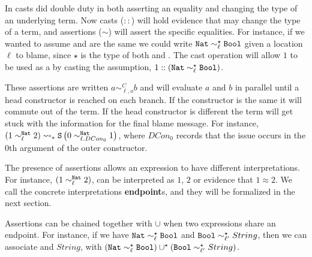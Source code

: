 
In  casts did double duty in both asserting an equality and changing the type of an underlying term.
Now casts ($::$) will hold evidence that may change the type of a term, and assertions ($\sim$) will assert the specific equalities.
For instance, if we wanted to assume \Nat{} and \Bool{} are the same we could write $\mathtt{Nat}{} \sim_{\ell}^{\star}\mathtt{Bool}{} $ given a location $\ell$ to blame, since $\star$ is the type of both \Nat{} and \Bool{}.
The cast operation will allow $1$ to be used as a \Bool{} by casting the assumption, $1::\left(\mathtt{Nat}{} \sim_{\ell}^{\star}\mathtt{Bool}{} \right)$. 

These assertions are written $a\sim_{\ell,o}^{C}b$ and will evaluate $a$ and $b$ in parallel until a head constructor is reached on each branch.
If the constructor is the same it will commute out of the term.
If the head constructor is different the term will get stuck with the information for the final blame message.
For instance, $\left(1 \sim_{\ell}^{\mathtt{Nat}{}} 2 \right)\rightsquigarrow_{*} \mathtt{S}{} \left(0 \sim_{\ell.DCon_{0}}^{\mathtt{Nat}{}} 1\right) $, where $DCon_{0}$ records that the issue occurs in the 0th argument of the outer \Suc constructor.


The presence of assertions allows an expression to have different interpretations.
For instance, $\left(1 \sim_{\ell}^{\mathtt{Nat}{}} 2 \right)$, can be interpreted as $1$, $2$ or evidence that $1\approx2$.
We call the concrete interpretations \textbf{endpoint}s, and they will be formalized in the next section.

Assertions can be chained together with $\cup$ when two expressions share an endpoint. %
For instance, if we have $\mathtt{Nat}{} \sim_{\ell}^{\star}\mathtt{Bool}{}$ and $\mathtt{Bool}{} \sim_{\ell'}^{\star}String$, then we can associate \Nat{} and $String$, with $\left(\mathtt{Nat}{} \sim_{\ell}^{\star}\mathtt{Bool}{} \right)\cup^{\star}\left(\mathtt{Bool}{} \sim_{\ell'}^{\star}String\right)$.

